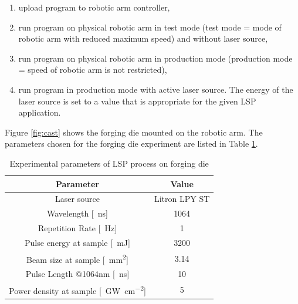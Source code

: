 \begin{enumerate}
    
\item upload program to robotic arm controller,

\item run program on physical robotic arm in test mode (test mode = mode of robotic arm with reduced maximum speed) and without laser source,

\item run program on physical robotic arm in production mode (production mode = speed of robotic arm is not restricted),

\item run program in production mode with active laser source. The energy of the laser source is set to a value that is appropriate for the given LSP application. 

\end{enumerate}

Figure \ref{fig:cast} shows the forging die mounted on the robotic arm. The parameters chosen for the forging die experiment are listed in Table \ref{experimental_forging}. 

\begin{table}[h!]
\centering
    \begin{threeparttable}
        \begin{tabular}{|c | c|} 
        \hline
            \textbf{Parameter} & \textbf{Value} \\ [0.5ex] 
        \hline
        Laser source & Litron LPY ST  \\
        \hline
        Wavelength [\SI{}{\nano\second}] & 1064 \\
        \hline
        Repetition Rate [\SI{}{\hertz}] & 1  \\ 
        \hline
            Pulse energy at sample [\SI{}{\milli\joule}] & 3200 \\
        \hline
            Beam size at sample [\SI{}{\mm\squared}] & 3.14 \\
        \hline
            Pulse Length @1064nm [\SI{}{\nano\second}] & 10 \\
        \hline
            Power density at sample [\SI{}{\giga\watt\per\cm\squared}] & 5 \\

        \hline
        \end{tabular}

        \caption{Experimental parameters of LSP process on forging die}
        \label{experimental_forging}
    \end{threeparttable}
\end{table}

